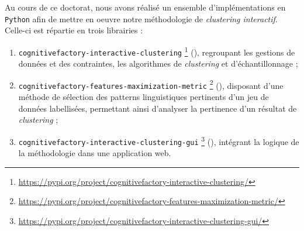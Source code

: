 \label{annex:C-ANNEXE-IMPLEMENTATIONS}

	Au cours de ce doctorat, nous avons réalisé un ensemble d'implémentations en \texttt{Python} afin de mettre en oeuvre notre méthodologie de \textit{clustering interactif}.
	Celle-ci est répartie en trois librairies :
	\begin{enumerate}
		\item \texttt{cognitivefactory-interactive-clustering} \footnote{
			\url{https://pypi.org/project/cognitivefactory-interactive-clustering/}
		} (\cite{schild:2022:cognitivefactory-interactiveclustering}), regroupant les gestions de données et des contraintes, les algorithmes de \textit{clustering} et d'échantillonnage ;
		\item \texttt{cognitivefactory-features-maximization-metric} \footnote{
			\url{https://pypi.org/project/cognitivefactory-features-maximization-metric/}
		} (\cite{schild:2023:cognitivefactory-featuresmaximizationmetric}), disposant d'une méthode de sélection des patterns linguistiques pertinents d'un jeu de données labellisées, permettant ainsi d'analyser la pertinence d'un résultat de \textit{clustering} ;
		\item \texttt{cognitivefactory-interactive-clustering-gui} \footnote{
			\url{https://pypi.org/project/cognitivefactory-interactive-clustering-gui/}
		} (\cite{schild-etal:2022:cognitivefactory-interactiveclusteringgui}), intégrant la logique de la méthodologie dans une application web.
	\end{enumerate}
	

